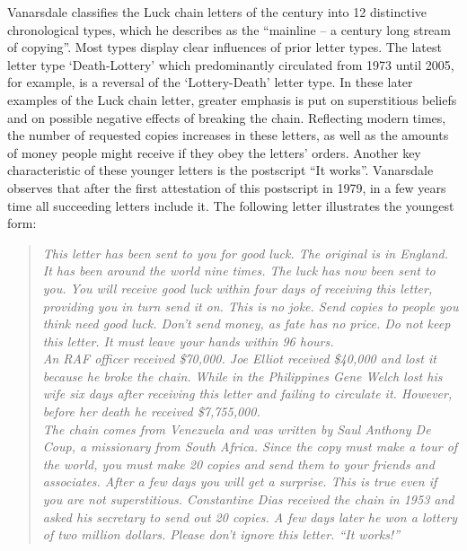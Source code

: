 Vanarsdale classifies the Luck chain letters of the  century into 12 distinctive chronological types, which he describes as the ``mainline -- a century long stream of copying''. Most types display clear influences of prior letter types. The latest letter type `Death-Lottery' which predominantly circulated from 1973 until 2005, for example, is a reversal of the `Lottery-Death' letter type. In these later examples of the Luck chain letter, greater emphasis is put on superstitious beliefs and on possible negative effects of breaking the chain. Reflecting modern times, the number of requested copies increases in these letters, as well as the amounts of money people might receive if they obey the letters' orders. Another key characteristic of these younger letters is the postscript ``It works''. Vanarsdale observes that after the first attestation of this postscript in 1979, in a few years time all succeeding letters include it. The following letter illustrates the youngest form:
\begin{quote}
{\it
\noindent This letter has been sent to you for good luck. The original is in England. It has been around the world nine times. The luck has now been sent to you. You will receive good luck within four days of receiving this letter, providing you in turn send it on. This is no joke. Send copies to people you think need good luck. Don't send money, as fate has no price. Do not keep this letter. It must leave your hands within 96 hours.\\

\noindent An RAF officer received \$70,000. Joe Elliot received \$40,000 and lost it because he broke the chain. While in the Philippines Gene Welch lost his wife six days after receiving this letter and failing to circulate it. However, before her death he received \$7,755,000.\\

\noindent The chain comes from Venezuela and was written by Saul Anthony De Coup, a missionary from South Africa. Since the copy must make a tour of the world, you must make 20 copies and send them to your friends and associates. After a few days you will get a surprise. This is true even if you are not superstitious. Constantine Dias received the chain in 1953 and asked his secretary to send out 20 copies. A few days later he won a lottery of two million dollars. Please don't ignore this letter. ``It works!''}\autocite[Taken from \texttt{le1985-03\_dl\_w0\_.htm} in][]{vanarsdale_archive:2015}
\end{quote}

